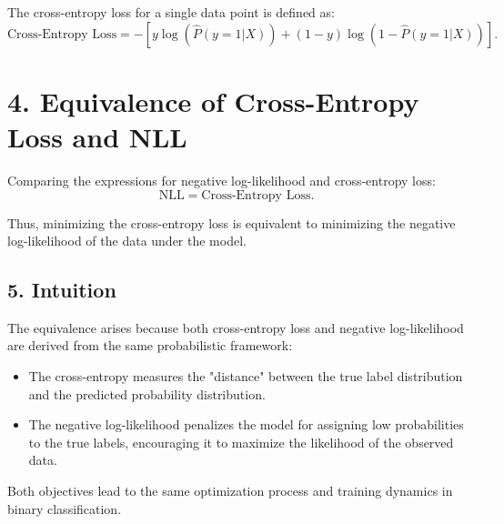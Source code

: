 \documentclass{article}
\begin{document}
The cross-entropy loss for a single data point is defined as:
\[
\text{Cross-Entropy Loss} = - \left[ y \log(\hat{P}(y=1|X)) + (1-y) \log(1 - \hat{P}(y=1|X)) \right].
\]

\section*{4. Equivalence of Cross-Entropy Loss and NLL}

Comparing the expressions for negative log-likelihood and cross-entropy loss:
\[
\text{NLL} = \text{Cross-Entropy Loss}.
\]

Thus, minimizing the cross-entropy loss is equivalent to minimizing the negative log-likelihood of the data under the model.

\subsection*{5. Intuition}

The equivalence arises because both cross-entropy loss and negative log-likelihood are derived from the same probabilistic framework:
\begin{itemize}
    \item The cross-entropy measures the "distance" between the true label distribution and the predicted probability distribution.
    \item The negative log-likelihood penalizes the model for assigning low probabilities to the true labels, encouraging it to maximize the likelihood of the observed data.
\end{itemize}

Both objectives lead to the same optimization process and training dynamics in binary classification.
\end{document}
